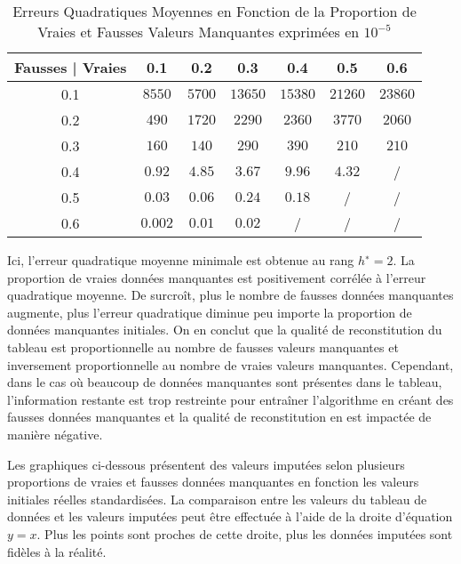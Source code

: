 \documentclass[12pt, openany, fleqn, french]{article}
\begin{document}
\hspace{2cm}

\begin{table}[H]
\begin{center}
\begin{tabular}{||c || c c c c c c||} 
 \hline
 Fausses | Vraies & 0.1 & 0.2 & 0.3 & 0.4 & 0.5 & 0.6  \\ [0.1ex] 
 \hline\hline
 0.1 & $8550$ & $5700$ & $13650$ & $15380$ & $21260$ & $23860$ \\ 
 \hline
 0.2 & $490$ & $1720$ & $2290$ & $2360$ & $3770$ & $2060$ \\
 \hline
 0.3 & $160$ & $140$ & $290$ & $390$ & $210$ & $210$ \\
 \hline
 0.4 & $0.92$ & $4.85$ & $3.67$ & $9.96$ & $4.32$  & /\\
 \hline
 0.5 & $0.03$ & $0.06$ & $0.24$ & $0.18$ &  / & / \\
 \hline
 0.6 & $0.002$ & $0.01$ & $0.02$ & / &  / & / \\
 \hline
 \end{tabular}
 \caption{Erreurs Quadratiques Moyennes en Fonction de la Proportion de Vraies et Fausses Valeurs Manquantes exprimées en $10^{-5}$}
\end{center}
\end{table}


Ici, l’erreur quadratique moyenne minimale est obtenue au rang $h^{∗} = 2$. La proportion de vraies données manquantes est positivement corrélée à l'erreur quadratique moyenne. De surcroît, plus le nombre de fausses données manquantes augmente, plus l'erreur quadratique diminue peu importe la proportion de données manquantes initiales. 
On en conclut que la qualité de reconstitution du tableau est proportionnelle au nombre de fausses valeurs manquantes et inversement proportionnelle au nombre de vraies valeurs manquantes. Cependant, dans le cas où beaucoup de données manquantes sont présentes dans le tableau, l'information restante est trop restreinte pour entraîner l'algorithme en créant des fausses données manquantes et la qualité de reconstitution en est impactée de manière négative.


Les graphiques ci-dessous présentent des valeurs imputées selon plusieurs proportions de vraies et fausses données manquantes en fonction les valeurs initiales réelles standardisées. La comparaison entre les valeurs du tableau de données et les valeurs imputées peut être effectuée à l'aide de la droite d'équation $y=x$. Plus les points sont proches de cette droite, plus les données imputées sont fidèles à la réalité.
\end{document}
